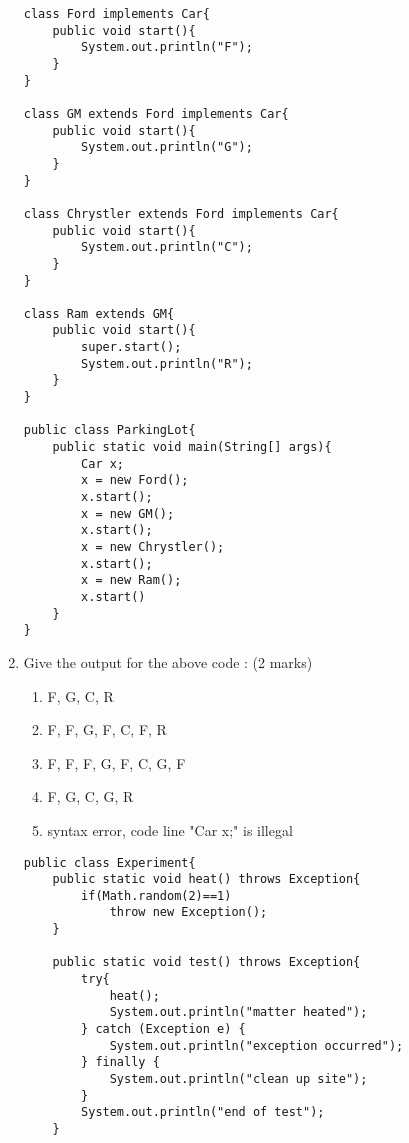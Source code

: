 \documentclass{article}
\begin{document}
\begin{enumerate}[resume]
\begin{lstlisting}
class Ford implements Car{
	public void start(){
		System.out.println("F");
	}
}

class GM extends Ford implements Car{
	public void start(){
		System.out.println("G");
	}
}

class Chrystler extends Ford implements Car{
	public void start(){
		System.out.println("C");
	}
}

class Ram extends GM{
	public void start(){
		super.start();
		System.out.println("R");
	}
}

public class ParkingLot{
	public static void main(String[] args){
		Car x;
		x = new Ford();
		x.start();
		x = new GM();
		x.start();
		x = new Chrystler();
		x.start();
		x = new Ram();
		x.start()
	}
}
	\end{lstlisting}
	\item Give the output for the above code : (2 marks)
	\begin{enumerate}
		\item F, G, C, R
		\item F, F, G, F, C, F, R
		\item F, F, F, G, F, C, G, F
		\item F, G, C, G, R
		\item syntax error, code line "Car x;" is illegal
	\end{enumerate}
	\newpage
	\begin{lstlisting}
public class Experiment{
	public static void heat() throws Exception{
		if(Math.random(2)==1)
			throw new Exception();
	}
	
	public static void test() throws Exception{
		try{
			heat();
			System.out.println("matter heated");
		} catch (Exception e) {
			System.out.println("exception occurred");
		} finally {
			System.out.println("clean up site");
		}
		System.out.println("end of test");
	}
	

\end{lstlisting}
\end{enumerate}
\end{document}
